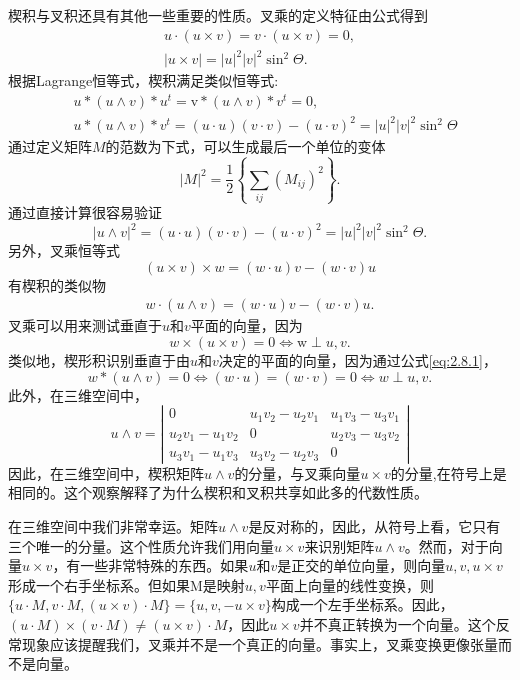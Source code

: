 \begin{CJK}{UTF8}{gbsn}
楔积与叉积还具有其他一些重要的性质。叉乘的定义特征由公式得到
$$
\begin{gathered}
u \cdot(u \times v)=v \cdot(u \times v)=0, \\
|u \times v|=|u|^{2}|v|^{2} \sin ^{2} \Theta .
\end{gathered}
$$
根据Lagrange恒等式，楔积满足类似恒等式:
$$
\begin{aligned}
&u *(u \wedge v) * u^{t}=\mathrm{v} *(u \wedge v) * v^{t}=0, \\
&u *(u \wedge v) * v^{t}=(u \cdot u)(v \cdot v)-(u \cdot v)^{2}=\left|u\right|^{2}\left| v\right|^{2} \sin ^{2} \Theta
\end{aligned}
$$
通过定义矩阵$M$的范数为下式，可以生成最后一个单位的变体
$$
|M|^{2}=\frac{1}{2}\left\lbrace \sum_{i j}\left(M_{i j}\right)^{2} \right\rbrace .
$$
通过直接计算很容易验证
$$
|u \wedge v|^{2}=(u \cdot u)(v \cdot v)-(u \cdot v)^{2}=|u|^{2}|v|^{2} \sin ^{2} \Theta .
$$
另外，叉乘恒等式
$$
(u \times v) \times w=(w \cdot u) v-(w \cdot v) u
$$
有楔积的类似物
\begin{align}
w \cdot(u \wedge v)=(w \cdot u) v-(w \cdot v) u .
\label{eq:2.8.1}
\end{align}
叉乘可以用来测试垂直于$u$和$v$平面的向量，因为
$$
w \times(u \times v)=0 \Leftrightarrow \mathrm{w} \perp u, v .
$$
类似地，楔形积识别垂直于由$u$和$v$决定的平面的向量，因为通过公式\ref{eq:2.8.1}，
$$
w *(u \wedge v)=0 \Leftrightarrow(w \cdot u)=(w \cdot v)=0 \Leftrightarrow w \perp u, v .
$$
此外，在三维空间中，
$$
u \wedge v=\left|\begin{array}{ccc}
0 & u_{1} v_{2}-u_{2} v_{1} & u_{1} v_{3}-u_{3} v_{1} \\
u_{2} v_{1}-u_{1} v_{2} & 0 & u_{2} v_{3}-u_{3} v_{2} \\
u_{3} v_{1}-u_{1} v_{3} & u_{3} v_{2}-u_{2} v_{3} & 0
\end{array}\right|
$$
因此，在三维空间中，楔积矩阵$u \wedge v$的分量，与叉乘向量$u \times v$的分量,在符号上是相同的。这个观察解释了为什么楔积和叉积共享如此多的代数性质。

在三维空间中我们非常幸运。矩阵$u \wedge v$是反对称的，因此，从符号上看，它只有三个唯一的分量。这个性质允许我们用向量$u \times v$来识别矩阵$u \wedge v$。然而，对于向量$u \times v$，有一些非常特殊的东西。如果$u$和$v$是正交的单位向量，则向量$u, v, u \times v$形成一个右手坐标系。但如果$\mathrm{M}$是映射$u, v$平面上向量的线性变换，则$\{u \cdot M, v \cdot M,(u \times v) \cdot M\}=\{u, v,-u \times v\}$构成一个左手坐标系。因此，$(u \cdot M) \times (v \cdot M) \neq(u \times v) \cdot M$，因此$u \times v$并不真正转换为一个向量。这个反常现象应该提醒我们，叉乘并不是一个真正的向量。事实上，叉乘变换更像张量而不是向量。


\end{CJK}
